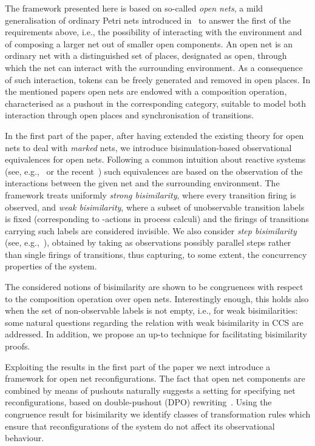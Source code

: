 \documentclass{LMCS}
\begin{document}
The framework presented here is based on so-called \emph{open nets}, a
mild generalisation of ordinary Petri nets introduced
in~\cite{BCEH:CMRS,BCEH:CSOP} to answer the first of the requirements
above, i.e., the possibility of interacting with the environment and
of composing a larger net out of smaller open components. An open net
is an ordinary net with a distinguished set of places, designated as
open, through which the net can interact with the surrounding
environment. As a consequence of such interaction, tokens can be
freely generated and removed in open places.
In the mentioned papers open nets are endowed with a composition
operation, characterised as a pushout in the corresponding category,
suitable to model both interaction through open places and
synchronisation of transitions.  


In the first part of the paper, after having extended the existing
theory for open nets to deal with \emph{marked} nets,
we introduce bisimulation-based observational equivalences for open 
nets.
Following a common intuition about reactive systems (see,
e.g.,~\cite{v:modular-petri,NPS:CBCP} or the recent~\cite{LM:DBCRS})
such equivalences are based on the observation of the interactions
between the given net and the surrounding environment.
The framework treats uniformly \emph{strong
  bisimilarity}, where every transition firing is observed, and
\emph{weak bisimilarity}, where a subset of unobservable transition
labels is fixed (corresponding to -actions in process calculi)
and the firings of transitions carrying such labels are considered
invisible.
We also consider \emph{step bisimilarity} (see,
e.g.,~\cite{Vog:BAR,NT:DNDC}), obtained by taking as
observations possibly parallel steps rather than single firings of
transitions, thus capturing, to some extent, the concurrency
properties of the system.

The considered notions of bisimilarity are shown to be congruences
with respect to the composition operation over open
nets. Interestingly enough, this holds also when the set of
non-observable labels is not empty, i.e., for weak bisimilarities: some
natural questions regarding the relation with weak bisimilarity in CCS
are addressed. In addition, we propose an up-to technique for
facilitating bisimilarity proofs.

Exploiting the results in the first part of the paper we next introduce a
framework for open net reconfigurations.
The fact that open net components are combined by means of pushouts
naturally suggests a setting for specifying net
reconfigurations, based on double-pushout (DPO)
rewriting~\cite{Ehr:TIAA}.
Using the congruence result for bisimilarity we identify classes of
transformation rules which ensure that reconfigurations of the system
do not affect its observational behaviour.
\end{document}
